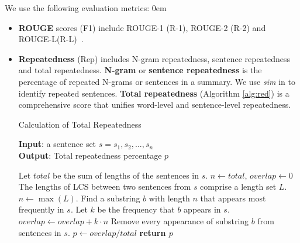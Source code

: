 We use the following evaluation metrics:
\itemsep0em
\begin{itemize}

\item \textbf{ROUGE} scores (F1) include ROUGE-1 (R-1), ROUGE-2 (R-2) and
ROUGE-L(R-L)~\cite{rouge-a-package-for-automatic-evaluation-of-summaries}.

\item \textbf{Repeatedness} (Rep) 
includes N-gram repeatedness, sentence repeatedness
and total repeatedness.
\textbf{N-gram} or \textbf{sentence repeatedness} is the percentage of repeated N-grams 
or sentences in a summary.
We use \textit{sim} in  to
identify repeated sentences.
\textbf{Total repeatedness} (Algorithm \ref{alg:red}) is a comprehensive score
that unifies word-level and sentence-level repeatedness.
\begin{minipage}{10cm}
\begin{algorithm}[H]
\scriptsize
\caption{Calculation of Total Repeatedness}
\label{alg:red}
\textbf{Input}: a sentence set $s = {s_{1}, s_{2},...,s_{n}}$\\
\textbf{Output}: Total repeatedness percentage $p$
\begin{algorithmic}[1] %
\STATE Let $total$ be the sum of lengths of the sentences in $s$.
\STATE $n \leftarrow total$, $overlap \leftarrow 0$
\STATE The lengths of LCS between two sentences from $s$ comprise a length set $L$.
\STATE $n \leftarrow \max(L)$.
\STATE Find a substring $b$ with length $n$ that appears most frequently in $s$.
\STATE Let $k$ be the frequency that $b$ appears in $s$.
\STATE $overlap \leftarrow overlap + k\cdot n$
\STATE Remove every appearance of substring $b$ from sentences in $s$.
\ENDWHILE
\STATE $p \leftarrow overlap/total$
\STATE \textbf{return $p$} 
\end{algorithmic}
\end{algorithm}
\end{minipage}



\end{itemize}
